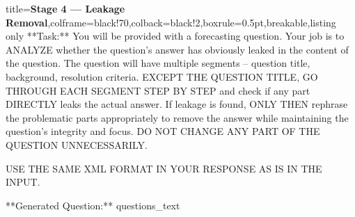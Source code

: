 \documentclass{article} %
\begin{document}
\begin{tcblisting}{title={\textbf{Stage 4 --- Leakage Removal}},colframe=black!70,colback=black!2,boxrule=0.5pt,breakable,listing only}
**Task:** You will be provided with a forecasting question. Your job is to ANALYZE whether the question's answer has obviously leaked in the content of the question. The question will have multiple segments -- question title, background, resolution criteria. EXCEPT THE QUESTION TITLE, GO THROUGH EACH SEGMENT STEP BY STEP and check if any part DIRECTLY leaks the actual answer. If leakage is found, ONLY THEN rephrase the problematic parts appropriately to remove the answer while maintaining the question's integrity and focus. DO NOT CHANGE ANY PART OF THE QUESTION UNNECESSARILY. 

USE THE SAME XML FORMAT IN YOUR RESPONSE AS IS IN THE INPUT.

**Generated Question:**
{questions_text}


\end{tcblisting}
\end{document}

